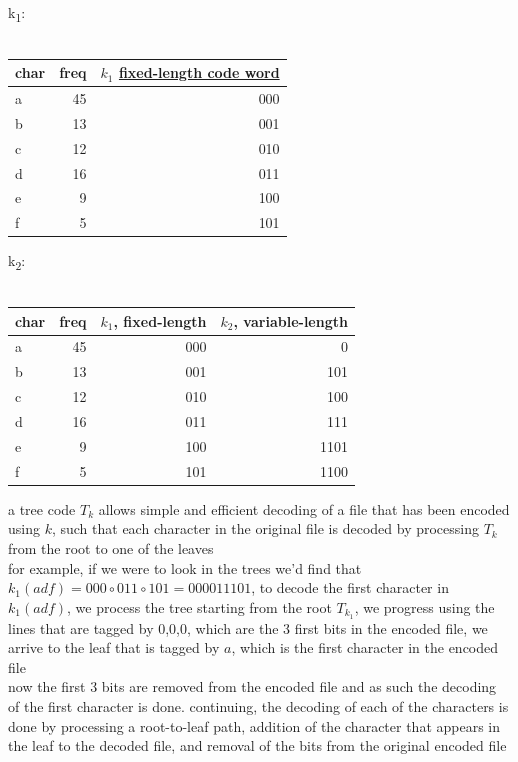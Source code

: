 \documentclass[a4paper,12pt]{article}
\newcommand{\?}{\stackrel{?}{=}}
\begin{document}
\begin{my_example}
k\textsubscript{1}:\\[0pt]
\\[0pt]

\begin{tabular}{lrr}
char & freq & \(k_1\) \href{20230119170007-fixed_length_code_word.org}{fixed-length code word}\\[0pt]
\hline
a & 45 & 000\\[0pt]
b & 13 & 001\\[0pt]
c & 12 & 010\\[0pt]
d & 16 & 011\\[0pt]
e & 9 & 100\\[0pt]
f & 5 & 101\\[0pt]
\end{tabular}

k\textsubscript{2}:\\[0pt]

\\[0pt]

\begin{tabular}{lrrr}
char & freq & \(k_1\), fixed-length & \(k_2\), variable-length\\[0pt]
\hline
a & 45 & 000 & 0\\[0pt]
b & 13 & 001 & 101\\[0pt]
c & 12 & 010 & 100\\[0pt]
d & 16 & 011 & 111\\[0pt]
e & 9 & 100 & 1101\\[0pt]
f & 5 & 101 & 1100\\[0pt]
\end{tabular}

a tree code \(T_k\) allows simple and efficient decoding of a file that has been encoded using \(k\), such that each character in the original file is decoded by processing \(T_k\) from the root to one of the leaves\\[0pt]
for example, if we were to look in the trees we'd find that \(k_1(adf)=000\circ011\circ101=000011101\), to decode the first character in \(k_1(adf)\), we process the tree starting from the root \(T_{k_1}\), we progress using the lines that are tagged by 0,0,0, which are the 3 first bits in the encoded file, we arrive to the leaf that is tagged by \(a\), which is the first character in the encoded file\\[0pt]
now the first 3 bits are removed from the encoded file and as such the decoding of the first character is done. continuing, the decoding of each of the characters is done by processing a root-to-leaf path, addition of the character that appears in the leaf to the decoded file, and removal of the bits from the original encoded file\\[0pt]
\end{my_example}
\end{document}
